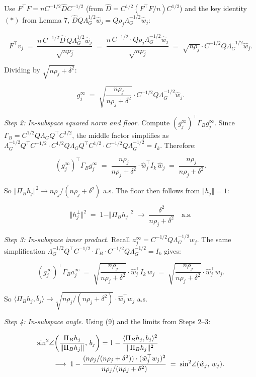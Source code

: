\documentclass{article}
\theoremstyle{remark}
\begin{document}
Use $F^\top F = nC^{-1/2}\hat{D}C^{-1/2}$ (from $\hat{D} = C^{1/2}(F^\top F/n)C^{1/2}$) and the key identity $(*)$ from Lemma 7, $\hat{D}Q\Lambda_G^{1/2}\hat{w}_j = Q\rho_j\Lambda_G^{-1/2}\hat{w}_j$:

\[
F^\top v_j \;=\; \frac{n\,C^{-1/2}\hat{D}\,Q\Lambda_G^{1/2}\hat{w}_j}{\sqrt{n\rho_j}} \;=\; \frac{n\,C^{-1/2}\cdot Q\rho_j\Lambda_G^{-1/2}\hat{w}_j}{\sqrt{n\rho_j}} \;=\; \sqrt{n\rho_j}\cdot C^{-1/2}Q\Lambda_G^{-1/2}\hat{w}_j.
\]

Dividing by $\sqrt{n\rho_j + \delta^2}$:

\[
g_j^\infty \;=\; \sqrt{\frac{n\rho_j}{n\rho_j+\delta^2}}\cdot C^{-1/2}Q\Lambda_G^{-1/2}\hat{w}_j. \tag{14}
\]

\textit{Step 2: In-subspace squared norm and floor.} Compute $(g_j^\infty)^\top\Gamma_B g_j^\infty$. Since $\Gamma_B = C^{1/2}Q\Lambda_G Q^\top C^{1/2}$, the middle factor simplifies as $\Lambda_G^{-1/2}Q^\top C^{-1/2}\cdot C^{1/2}Q\Lambda_G Q^\top C^{1/2}\cdot C^{-1/2}Q\Lambda_G^{-1/2} = I_k$. Therefore:

\[
(g_j^\infty)^\top\Gamma_B g_j^\infty \;=\; \frac{n\rho_j}{n\rho_j+\delta^2}\cdot\hat{w}_j^\top I_k\,\hat{w}_j \;=\; \frac{n\rho_j}{n\rho_j+\delta^2}.
\]

So $\Vert \Pi_B h_j\Vert^2 \to n\rho_j/(n\rho_j+\delta^2)$ a.s. The floor then follows from $\Vert h_j\Vert  = 1$:

\[
\Vert h_j^\perp\Vert^2 \;=\; 1 - \Vert \Pi_B h_j\Vert^2 \;\longrightarrow\; \frac{\delta^2}{n\rho_j+\delta^2} \quad\text{a.s.} \tag{15}
\]

\textit{Step 3: In-subspace inner product.} Recall $a_j^\infty = C^{-1/2}Q\Lambda_G^{-1/2}w_j$. The same simplification $\Lambda_G^{-1/2}Q^\top C^{-1/2}\cdot\Gamma_B\cdot C^{-1/2}Q\Lambda_G^{-1/2} = I_k$ gives:

\[
(g_j^\infty)^\top\Gamma_B a_j^\infty \;=\; \sqrt{\frac{n\rho_j}{n\rho_j+\delta^2}}\cdot\hat{w}_j^\top I_k\,w_j \;=\; \sqrt{\frac{n\rho_j}{n\rho_j+\delta^2}}\cdot\hat{w}_j^\top w_j.
\]

So $\langle\Pi_B h_j, \bar{b}_j\rangle \to \sqrt{n\rho_j/(n\rho_j+\delta^2)}\cdot\hat{w}_j^\top w_j$ a.s.

\textit{Step 4: In-subspace angle.} Using (9) and the limits from Steps 2–3:

\begin{align}
\sin^2\!\angle\!&\left(\frac{\Pi_B h_j}{\Vert \Pi_B h_j\Vert },\,\bar{b}_j\right) = 1 - \frac{\langle\Pi_B h_j, \bar{b}_j\rangle^2}{\Vert \Pi_B h_j\Vert^2}\notag\\ &\longrightarrow\; 1 - \frac{(n\rho_j/(n\rho_j+\delta^2))\cdot(\hat{w}_j^\top w_j)^2}{n\rho_j/(n\rho_j+\delta^2)} \;=\; \sin^2\!\angle(\hat{w}_j,\,w_j).\notag
\end{align}
\end{document}
